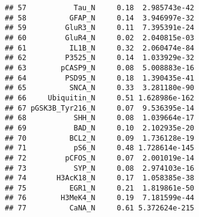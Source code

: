 \documentclass[
]{article}
\newenvironment{Shaded}{\begin{snugshade}}{\end{snugshade}}
\newcommand{\DecValTok}[1]{\textcolor[rgb]{0.00,0.00,0.81}{#1}}
\newcommand{\FunctionTok}[1]{\textcolor[rgb]{0.00,0.00,0.00}{#1}}
\newcommand{\NormalTok}[1]{#1}
\newcommand{\OtherTok}[1]{\textcolor[rgb]{0.56,0.35,0.01}{#1}}
\newcommand{\SpecialCharTok}[1]{\textcolor[rgb]{0.00,0.00,0.00}{#1}}
\begin{document}
\begin{verbatim}
## 57           Tau_N     0.18  2.985743e-42
## 58          GFAP_N     0.14  3.946997e-32
## 59         GluR3_N     0.11  7.395391e-24
## 60         GluR4_N     0.02  2.040815e-03
## 61          IL1B_N     0.32  2.060474e-84
## 62         P3525_N     0.14  1.033929e-32
## 63        pCASP9_N     0.08  5.008883e-16
## 64         PSD95_N     0.18  1.390435e-41
## 65          SNCA_N     0.33  3.281180e-90
## 66     Ubiquitin_N     0.51 1.628986e-162
## 67 pGSK3B_Tyr216_N     0.07  9.536395e-14
## 68           SHH_N     0.08  1.039664e-17
## 69           BAD_N     0.10  2.102935e-20
## 70          BCL2_N     0.09  1.736128e-19
## 71           pS6_N     0.48 1.728614e-145
## 72         pCFOS_N     0.07  2.001019e-14
## 73           SYP_N     0.08  2.974103e-16
## 74       H3AcK18_N     0.17  1.058385e-38
## 75          EGR1_N     0.21  1.819861e-50
## 76        H3MeK4_N     0.19  7.181599e-44
## 77          CaNA_N     0.61 5.372624e-215
\end{verbatim}

\begin{Shaded}
\end{Shaded}
\end{document}
